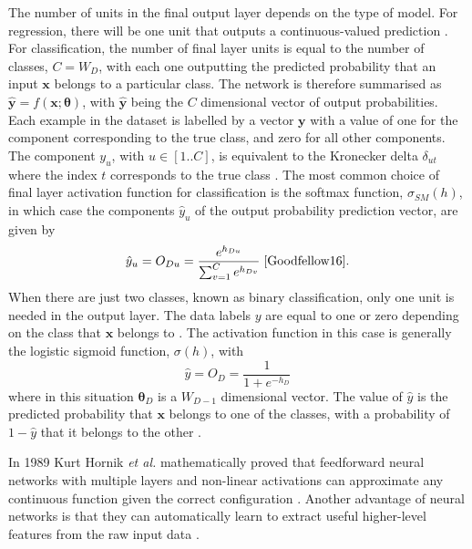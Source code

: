 \documentclass[12pt]{article}
\begin{document}
The number of units in the final output layer depends on the type of model. For regression, there will be one unit that outputs a continuous-valued prediction \cite{Goodfellow16}. For classification, the number of final layer units is equal to the number of classes, $C=W_D$, with each one outputting the predicted probability that an input $\bm{x}$ belongs to a particular class. The network is therefore summarised as $\hat{\bm{y}}=f(\bm{x};\boldsymbol\theta)$, with $\hat{\bm{y}}$ being the $C$ dimensional vector of output probabilities. Each example in the dataset is labelled by a vector $\bm{y}$ with a value of one for the component corresponding to the true class, and zero for all other components. The component $y_u$, with $u\in[1..C]$, is equivalent to the Kronecker delta $\delta_{ut}$ where the index $t$ corresponds to the true class \cite{Goodfellow16}. The most common choice of final layer activation function for classification is the softmax function, $\sigma_{SM}(h)$, in which case the components $\hat{y}_u$ of the output probability prediction vector, are given by
\begin{equation}
\hat{y}_u=O_{Du}=\frac{e^{h_{Du}}}{\sum_{v=1}^{C}e^{h_{Dv}}}\;\cite{Goodfellow16}.
\end{equation} 
When there are just two classes, known as binary classification, only one unit is needed in the output layer. The data labels $y$ are equal to one or zero depending on the class that $\bm{x}$ belongs to \cite{Goodfellow16}. The activation function in this case is generally the logistic sigmoid function, $\sigma(h)$, with
\begin{equation}
\hat{y}=O_D=\frac{1}{1+e^{-h_D}}
\end{equation}
where in this situation $\boldsymbol\theta_D$ is a $W_{D-1}$ dimensional vector. The value of $\hat{y}$ is the predicted probability that $\bm{x}$ belongs to one of the classes, with a probability of $1-\hat{y}$ that it belongs to the other \cite{Goodfellow16}. 

In 1989 Kurt Hornik \textit{et al.} mathematically proved that feedforward neural networks with multiple layers and non-linear activations can approximate any continuous function given the correct configuration \cite{Hornik89}. Another advantage of neural networks is that they can automatically learn to extract useful higher-level features from the raw input data \cite{Haykin98}.
\end{document}
